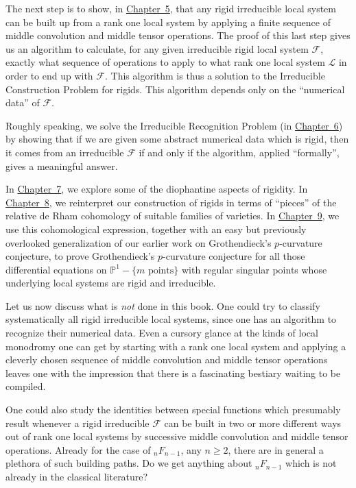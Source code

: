 The next step is to show, in \hyperref[chap:5]{Chapter~5}, that any rigid
irreducible local system can be built up from a rank one local system by
applying a finite sequence of middle convolution and middle tensor
operations. The proof of this last step gives us an algorithm to calculate,
for any given irreducible rigid local system \(\mathcal{F}\), exactly what
sequence of operations to apply to what rank one local system
\(\mathcal{L}\) in order to end up with \(\mathcal{F}\). This algorithm is
thus a solution to the Irreducible Construction Problem for rigids. This
algorithm depends only on the ``numerical data'' of \(\mathcal{F}\).

Roughly speaking, we solve the Irreducible Recognition Problem (in
\hyperref[chap:6]{Chapter~6}) by showing that if we are given some abstract
numerical data which is rigid, then it comes from an irreducible
\(\mathcal{F}\) if and only if the algorithm, applied ``formally'', gives
a meaningful answer.

In \hyperref[chap:7]{Chapter~7}, we explore some of the diophantine aspects
of rigidity. In \hyperref[chap:8]{Chapter~8}, we reinterpret our
construction of rigids in terms of ``pieces'' of the relative de Rham
cohomology of suitable families of varieties. In
\hyperref[chap:9]{Chapter~9}, we use this cohomological expression,
together with an easy but previously overlooked generalization of our
earlier work on Grothendieck's \(p\)-curvature conjecture, to prove
Grothendieck's \(p\)-curvature conjecture for all those differential
equations on \(\mathbb{P}^1-\{m\text{ points}\}\) with regular singular
points whose underlying local systems are rigid and irreducible.

Let us now discuss what is \emph{not} done in this book. One could try to
classify systematically all rigid irreducible local systems, since one has
an algorithm to recognize their numerical data. Even a cursory glance at
the kinds of local monodromy one can get by starting with a rank one local
system and applying a cleverly chosen sequence of middle convolution and
middle tensor operations leaves one with the impression that there is a
fascinating bestiary waiting to be compiled.

One could also study the identities between special functions which
presumably result whenever a rigid irreducible \(\mathcal{F}\) can be built
in two or more different ways out of rank one local systems by successive
middle convolution and middle tensor operations. Already for the case of
\({}_nF_{n-1}\), any \(n\geq2\), there are in general a plethora of such
building paths. Do we get anything about \({}_nF_{n-1}\) which is not
already in the classical literature?

